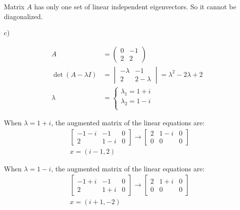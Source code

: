 \documentclass[letterpaper, 11pt]{article}
\newcommand{\1}{\mathds{1}}	%
\theoremstyle{definition}
\begin{document}
Matrix $A$ has only one set of linear independent eigenvectors. So it cannot be diagonalized.

c)

\begin{align*}
    A &= \begin{pmatrix}
        0 & -1 \\
        2 & 2
    \end{pmatrix} \\
    \det (A - \lambda I) &= \begin{vmatrix}
        -\lambda & -1 \\
        2 & 2-\lambda
    \end{vmatrix} = \lambda ^{2} - 2\lambda+2 \\
    \lambda &= \left\{\begin{array}{l}
        \lambda_{1} = 1+i\\
        \lambda_{2} = 1-i\\
    \end{array}\right.
\end{align*}

When $\lambda = 1+i$, the augmented matrix of the linear equations are: \begin{align*}
    &\left[\begin{array}{cc|c}
        -1-i & -1 & 0 \\
        2 & 1-i & 0 
    \end{array}\right] \to \left[\begin{array}{cc|c}
        2 & 1-i & 0 \\
        0 & 0 & 0 
    \end{array}\right] \\
    &x=(i-1,2)
\end{align*}

When $\lambda = 1-i$, the augmented matrix of the linear equations are: \begin{align*}
    &\left[\begin{array}{cc|c}
        -1+i & -1 & 0 \\
        2 & 1+i & 0 
    \end{array}\right] \to \left[\begin{array}{cc|c}
        2 & 1+i & 0 \\
        0 & 0 & 0 
    \end{array}\right] \\
    &x=(i+1,-2)
\end{align*}
\end{document}
